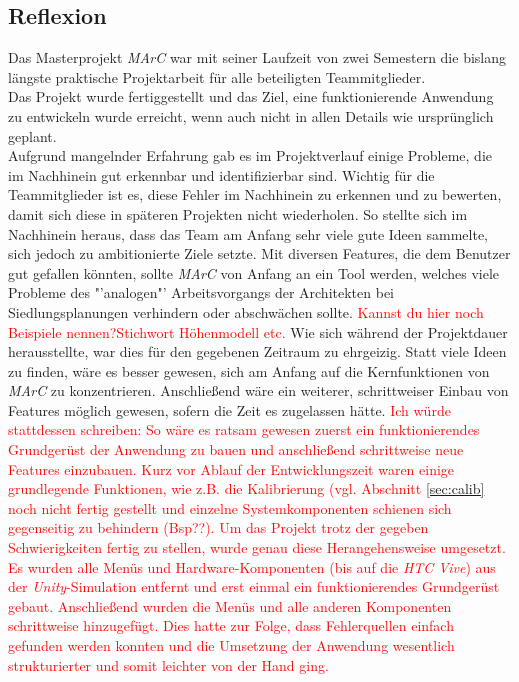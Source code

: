 \subsection{Reflexion}\label{sec:reflexion}
Das Masterprojekt \textit{MArC} war mit seiner Laufzeit von zwei Semestern die bislang längste praktische Projektarbeit für alle beteiligten Teammitglieder. \\
Das Projekt wurde fertiggestellt und das Ziel, eine funktionierende Anwendung zu entwickeln wurde erreicht, wenn auch nicht in allen Details wie ursprünglich geplant.\\
Aufgrund mangelnder Erfahrung gab es im Projektverlauf einige Probleme, die im Nachhinein gut erkennbar und identifizierbar sind. Wichtig für die Teammitglieder ist es, diese Fehler im Nachhinein zu erkennen und zu bewerten, damit sich diese in späteren Projekten nicht wiederholen. So stellte sich im Nachhinein heraus, dass das Team am Anfang sehr viele gute Ideen sammelte, sich jedoch zu ambitionierte Ziele setzte. Mit diversen Features, die dem Benutzer gut gefallen könnten, sollte \emph{MArC} von Anfang an ein Tool werden, welches viele Probleme des "'analogen"' Arbeitsvorgangs der Architekten bei Siedlungsplanungen verhindern oder abschwächen sollte. \textcolor{red}{Kannst du hier noch Beispiele nennen?Stichwort Höhenmodell etc.} Wie sich während der Projektdauer herausstellte, war dies für den gegebenen Zeitraum zu ehrgeizig. Statt viele Ideen zu finden, wäre es besser gewesen, sich am Anfang auf die Kernfunktionen von \textit{MArC} zu konzentrieren. Anschließend wäre ein weiterer, schrittweiser Einbau von Features möglich gewesen, sofern die Zeit es zugelassen hätte. \textcolor{red}{Ich würde stattdessen schreiben: So wäre es ratsam gewesen zuerst ein funktionierendes Grundgerüst der Anwendung zu bauen und anschließend schrittweise neue Features einzubauen. Kurz vor Ablauf der Entwicklungszeit waren einige grundlegende Funktionen, wie z.B. die Kalibrierung (vgl. Abschnitt \ref{sec:calib} noch nicht fertig gestellt und einzelne Systemkomponenten schienen sich gegenseitig zu behindern (Bsp??). Um das Projekt trotz der gegeben Schwierigkeiten fertig zu stellen, wurde genau diese Herangehensweise umgesetzt. Es wurden alle Menüs und Hardware-Komponenten (bis auf die \textit{HTC Vive}) aus der \textit{Unity}-Simulation entfernt und erst einmal ein funktionierendes Grundgerüst gebaut. Anschließend wurden die Menüs und alle anderen Komponenten schrittweise hinzugefügt. Dies hatte zur Folge, dass Fehlerquellen einfach gefunden werden konnten und die Umsetzung der Anwendung wesentlich strukturierter und somit leichter von der Hand ging.}\\
